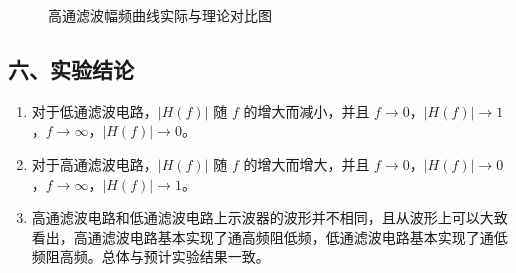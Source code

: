 \documentclass[dvipsnames, svgnames,a4paper,11pt]{article}
\begin{document}
\begin{figure}[htbp]
	\centering

	\caption{高通滤波幅频曲线实际与理论对比图}
\end{figure}

\subsection*{六、实验结论}
\begin{enumerate}
  \item 对于低通滤波电路，$|H(f)|$ 随 $f$ 的增大而减小，并且 $f \to 0$，$|H(f)| \to 1$，$f \to \infty$，$|H(f)| \to 0$。
  \item 对于高通滤波电路，$|H(f)|$ 随 $f$ 的增大而增大，并且 $f \to 0$，$|H(f)| \to 0$，$f \to \infty$，$|H(f)| \to 1$。
  \item 高通滤波电路和低通滤波电路上示波器的波形并不相同，且从波形上可以大致看出，高通滤波电路基本实现了通高频阻低频，低通滤波电路基本实现了通低频阻高频。总体与预计实验结果一致。
\end{enumerate}
\end{document}
